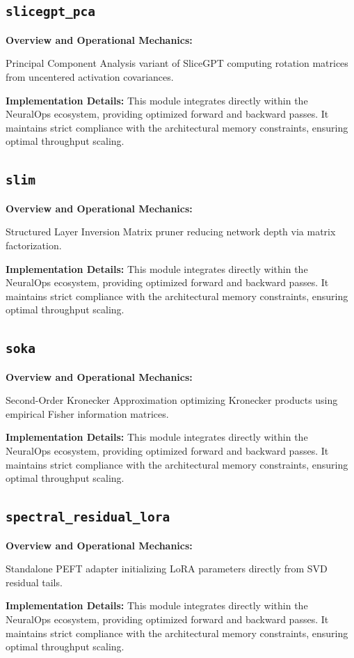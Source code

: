 \documentclass[10pt,twocolumn,letterpaper]{article}
\begin{document}
\subsection{\texttt{slicegpt\_pca}}
\textbf{Overview and Operational Mechanics:}

Principal Component Analysis variant of SliceGPT computing rotation matrices from uncentered activation covariances.

\textbf{Implementation Details:}
This module integrates directly within the NeuralOps ecosystem, providing optimized forward and backward passes. It maintains strict compliance with the architectural memory constraints, ensuring optimal throughput scaling.

\subsection{\texttt{slim}}
\textbf{Overview and Operational Mechanics:}

Structured Layer Inversion Matrix pruner reducing network depth via matrix factorization.

\textbf{Implementation Details:}
This module integrates directly within the NeuralOps ecosystem, providing optimized forward and backward passes. It maintains strict compliance with the architectural memory constraints, ensuring optimal throughput scaling.

\subsection{\texttt{soka}}
\textbf{Overview and Operational Mechanics:}

Second-Order Kronecker Approximation optimizing Kronecker products using empirical Fisher information matrices.

\textbf{Implementation Details:}
This module integrates directly within the NeuralOps ecosystem, providing optimized forward and backward passes. It maintains strict compliance with the architectural memory constraints, ensuring optimal throughput scaling.

\subsection{\texttt{spectral\_residual\_lora}}
\textbf{Overview and Operational Mechanics:}

Standalone PEFT adapter initializing LoRA parameters directly from SVD residual tails.

\textbf{Implementation Details:}
This module integrates directly within the NeuralOps ecosystem, providing optimized forward and backward passes. It maintains strict compliance with the architectural memory constraints, ensuring optimal throughput scaling.
\end{document}
